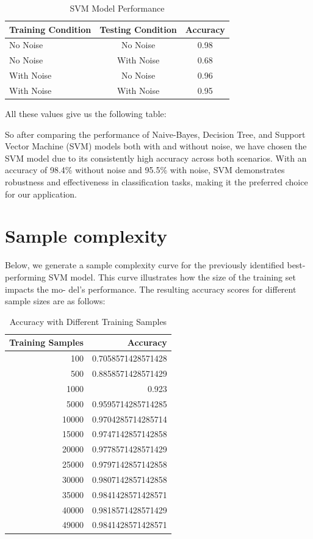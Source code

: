\documentclass{sbrt}
\begin{document}
\begin{table}[htbp]
  \centering
  \caption{SVM Model Performance}
    \begin{tabular}{lcc}
    \toprule
    \textbf{Training Condition} & \textbf{Testing Condition} & \textbf{Accuracy} \\
    \midrule
    No Noise & No Noise & 0.98 \\
    No Noise & With Noise & 0.68 \\
    With Noise & No Noise & 0.96 \\
    With Noise & With Noise & 0.95 \\
    \bottomrule
    \end{tabular}%
  \label{tab:addlabel}%
\end{table}%



All these values give us the following table:

So after comparing the performance of Naive-Bayes, Decision Tree, and Support Vector Machine (SVM) models both with and without noise, we have chosen the SVM model due to its consistently high accuracy across both scenarios. With an accuracy of 98.4\% without noise and 95.5\% with noise, SVM demonstrates robustness and effectiveness in classification tasks, making it the preferred choice for our application.

\section{Sample complexity}

Below, we generate a sample complexity curve for the
previously identified best-performing SVM model. This curve
illustrates how the size of the training set impacts the mo-
del’s performance. The resulting accuracy scores for different
sample sizes are as follows:

\begin{table}[htbp]
  \centering
  \caption{Accuracy with Different Training Samples}
    \begin{tabular}{rr}
    \toprule
    \textbf{Training Samples} & \textbf{Accuracy} \\
    \midrule
    100   & 0.7058571428571428 \\
    500   & 0.8858571428571429 \\
    1000  & 0.923 \\
    5000  & 0.9595714285714285 \\
    10000 & 0.9704285714285714 \\
    15000 & 0.9747142857142858 \\
    20000 & 0.9778571428571429 \\
    25000 & 0.9797142857142858 \\
    30000 & 0.9807142857142858 \\
    35000 & 0.9841428571428571 \\
    40000 & 0.9818571428571429 \\
    49000 & 0.9841428571428571 \\
    \bottomrule
    \end{tabular}%
  \label{tab:addlabel}%
\end{table}%
\end{document}
